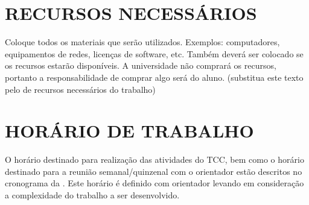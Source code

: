 
\section{RECURSOS NECESSÁRIOS}
\label{sec:recursos}
Coloque todos os materiais que serão utilizados. Exemplos: computadores, equipamentos de redes, licenças de software, etc. Também deverá ser colocado se os recursos estarão disponíveis. A universidade não comprará os recursos, portanto a responsabilidade de comprar algo será do aluno. (substitua este texto pelo de recursos necessários do trabalho)

\section{HORÁRIO DE TRABALHO}
\label{sec:horário}
O horário destinado para realização das atividades do TCC, bem como o horário destinado para a reunião semanal/quinzenal com o orientador estão descritos no cronograma da . Este horário é definido com orientador levando em consideração a complexidade do trabalho a ser desenvolvido.


